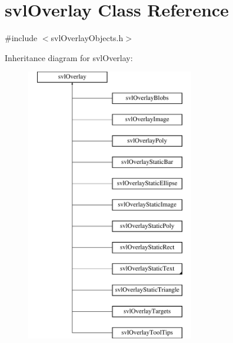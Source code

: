 \hypertarget{classsvl_overlay}{}\section{svl\+Overlay Class Reference}
\label{classsvl_overlay}


{\ttfamily \#include $<$svl\+Overlay\+Objects.\+h$>$}

Inheritance diagram for svl\+Overlay\+:\begin{figure}[H]
\begin{center}
\leavevmode
\includegraphics[height=12.000000cm]{dc/d84/classsvl_overlay}
\end{center}
\end{figure}
